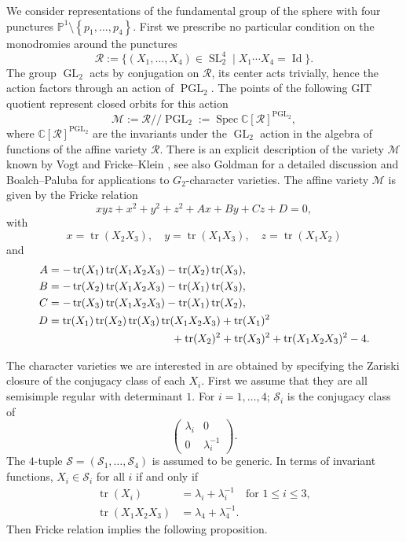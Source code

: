 \documentclass[JEP,XML,SOM,NoEqCountersInSection,Unicode,published]{cedram}
\newcommand{\gitquot}{/\!\!/}
\theoremstyle{definition}
\theoremstyle{plain}
\DeclareMathOperator{\Spec}{Spec}
\DeclareMathOperator{\Id}{Id}
\DeclareMathOperator{\tr}{tr}
\DeclareMathOperator{\GL}{GL}
\DeclareMathOperator{\SL}{SL}
\DeclareMathOperator{\PGL}{PGL}
\newcommand{\C}{\mathbb{C}}
\newcommand{\inv}{^{-1}}
\begin{document}
We consider representations of the fundamental group of the sphere with four punctures $\mathbb{P}^1\setminus \left\lbrace p_1,\dots,p_4\right\rbrace$. First we prescribe no particular condition on the monodromies around the punctures
\begin{equation*}
\mathcal{R}:=\lbrace (X_1,\dots,X_4)\in\SL_2^4\mid X_1\cdots X_4=\Id\rbrace.
\end{equation*}
The group $\GL_2$ acts by conjugation on $\mathcal R$, its center acts trivially, hence the action factors through an action of $\PGL_2$. The points of the following GIT quotient represent closed orbits for this action
\begin{equation*}
\mathcal{M}:=\mathcal{R}\gitquot\PGL_2:=\Spec \mathbb{C} \left[\mathcal R\right]^{\PGL_2},
\end{equation*}
where $\C \left[\mathcal R\right]^{\PGL_2}$ are the invariants under the $\GL_2$ action in the algebra of functions of the affine variety $\mathcal{R}$. There is an explicit description of the variety $\mathcal{M}$ known by Vogt \cite{Vogt} and Fricke--Klein \cite{Fricke_Klein}, see also Goldman \cite{Goldman2009} for a detailed discussion and Boalch--Paluba \cite{Boalch_Paluba} for applications to $G_2$-character varieties. The affine variety $\mathcal{M}$ is given by the Fricke relation
\begin{equation}\label{eq_fricke_rel}
x y z + x^2 +y^2 + z^2 + A x + B y + C z + D =0,
\end{equation}
with
\[
x=\tr(X_2 X_3), \quad y=\tr(X_1 X_3),\quad z=\tr(X_1 X_2)
\]
and
\begin{align*}
A &= -\tr(X_1)\tr(X_1 X_2 X_3) -\tr(X_2)\tr(X_3), \\
B &= -\tr(X_2)\tr(X_1 X_2 X_3)-\tr(X_1)\tr(X_3), \\
C &= -\tr(X_3)\tr(X_1 X_2 X_3) -\tr(X_1)\tr(X_2), \\
D &= \tr(X_1)\tr(X_2)\tr(X_3)\tr(X_1 X_2 X_3) + \tr(X_1)^2 \\
& \hspace*{3.95cm}+ \tr(X_2)^2 + \tr(X_3)^2 + \tr(X_1 X_2 X_3)^2 -4.
\end{align*}

The character varieties we are interested in are obtained by specifying the Zariski closure of the conjugacy class of each $X_i$. First we assume that they are all semisimple regular with determinant $1$. For $i=1,\dots, 4$; $\mathcal{S}_i$ is the conjugacy class of
\begin{equation}\label{conj2}
\left(\begin{array}{cc}
\lambda_i & 0 \\
0 & \lambda_i\inv
\end{array}\right).
\end{equation}
The $4$-tuple $\boldsymbol{\mathcal{S}}=\left(\mathcal{S}_1,\dots, \mathcal{S}_4\right)$ is assumed to be generic.
In terms of invariant functions, $X_i\in\mathcal{S}_i$ for all $i$ if and only if
\begin{align*}
\tr(X_i) &= \lambda_i+\lambda_i \inv \quad \text{for }1 \le i \le 3, \\
\tr(X_1 X_2 X_3) &= \lambda_4+\lambda_4\inv.
\end{align*}
Then Fricke relation implies the following proposition.
\end{document}
